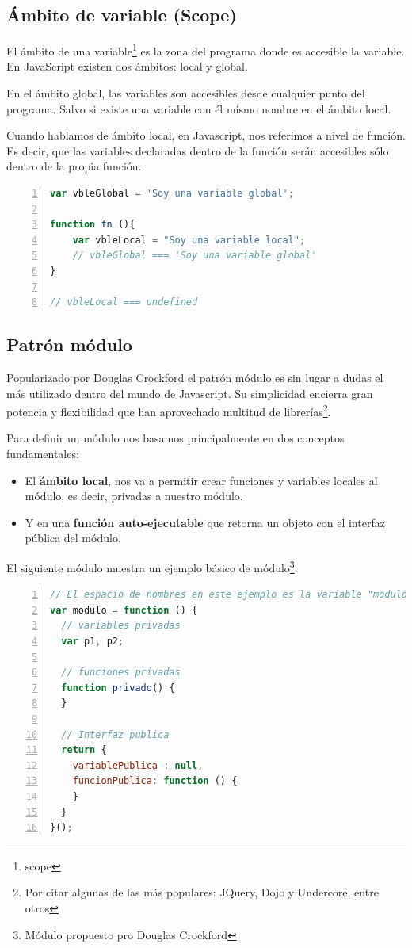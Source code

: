 \subsection{Ámbito de variable (Scope)}

El ámbito de una variable\footnote{scope} es la zona del programa donde es accesible la variable. En JavaScript existen dos ámbitos: local y global.

En el ámbito global, las variables son accesibles desde cualquier punto del programa. Salvo si existe una variable con él mismo nombre en el ámbito local. 

Cuando hablamos de ámbito local, en Javascript, nos referimos a nivel de función. Es decir, que las variables declaradas dentro de la función serán accesibles sólo dentro de la propia función. 


\begin{lstlisting}[language=JavaScript, numbers=left]
var vbleGlobal = 'Soy una variable global';

function fn (){
	var vbleLocal = "Soy una variable local";
	// vbleGlobal === 'Soy una variable global'
}

// vbleLocal === undefined 
\end{lstlisting}


\subsection{Patrón módulo}
Popularizado por Douglas Crockford el patrón módulo es sin lugar a dudas el más utilizado dentro del mundo de Javascript. Su simplicidad encierra gran potencia y flexibilidad que han aprovechado multitud de librerías\footnote{Por citar algunas de las más populares: JQuery, Dojo y Undercore, entre otros}.  

Para definir un módulo nos basamos principalmente en dos conceptos fundamentales: 
\begin{itemize}
\item El \textbf{ámbito local}, nos va a permitir crear funciones y variables locales al módulo, es decir, privadas a nuestro módulo. 
\item Y en una \textbf{función auto-ejecutable} que retorna un objeto con el interfaz pública del módulo.
\end{itemize}

El siguiente módulo muestra un ejemplo básico de módulo\footnote{Módulo propuesto pro Douglas Crockford}.

\begin{lstlisting}[language=JavaScript, numbers=left]
// El espacio de nombres en este ejemplo es la variable "modulo"
var modulo = function () {
  // variables privadas
  var p1, p2;
 
  // funciones privadas
  function privado() {
  }
 
  // Interfaz publica
  return {
    variablePublica : null,
    funcionPublica: function () {
    }
  }
}();
\end{lstlisting}


